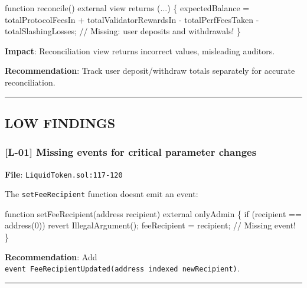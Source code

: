 \documentclass[
]{article}
\newenvironment{Shaded}{}{}
\newcommand{\NormalTok}[1]{#1}
\begin{document}
\begin{Shaded}
\begin{Highlighting}[]
\NormalTok{function reconcile() external view returns (...) \{}
\NormalTok{    expectedBalance = totalProtocolFeesIn + totalValidatorRewardsIn}
\NormalTok{                    {-} totalPerfFeesTaken {-} totalSlashingLosses;}
\NormalTok{    // Missing: user deposits and withdrawals!}
\NormalTok{\}}
\end{Highlighting}
\end{Shaded}

\textbf{Impact}: Reconciliation view returns incorrect values,
misleading auditors.

\textbf{Recommendation}: Track user deposit/withdraw totals separately
for accurate reconciliation.

\begin{center}\rule{0.5\linewidth}{0.5pt}\end{center}

\subsection{LOW FINDINGS}\label{low-findings}

\subsubsection{{[}L-01{]} Missing events for critical parameter
changes}\label{l-01-missing-events-for-critical-parameter-changes}

\textbf{File}: \texttt{LiquidToken.sol:117-120}

The \texttt{setFeeRecipient} function doesn\textquotesingle t emit an
event:

\begin{Shaded}
\begin{Highlighting}[]
\NormalTok{function setFeeRecipient(address recipient) external onlyAdmin \{}
\NormalTok{    if (recipient == address(0)) revert IllegalArgument();}
\NormalTok{    feeRecipient = recipient;}
\NormalTok{    // Missing event!}
\NormalTok{\}}
\end{Highlighting}
\end{Shaded}

\textbf{Recommendation}: Add
\texttt{event\ FeeRecipientUpdated(address\ indexed\ newRecipient)}.

\begin{center}\rule{0.5\linewidth}{0.5pt}\end{center}
\end{document}
